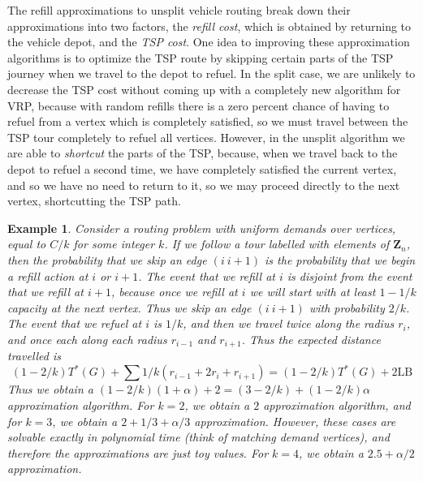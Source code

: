 \documentclass{article}
\theoremstyle{plain}
\newtheorem*{example}{Example}
\theoremstyle{plain}
\begin{document}
The refill approximations to unsplit vehicle routing break down their approximations into two factors, the {\it refill cost}, which is obtained by returning to the vehicle depot, and the {\it TSP cost}. One idea to improving these approximation algorithms is to optimize the TSP route by skipping certain parts of the TSP journey when we travel to the depot to refuel. In the split case, we are unlikely to decrease the TSP cost without coming up with a completely new algorithm for VRP, because with random refills there is a zero percent chance of having to refuel from a vertex which is completely satisfied, so we must travel between the TSP tour completely to refuel all vertices. However, in the unsplit algorithm we are able to {\it shortcut} the parts of the TSP, because, when we travel back to the depot to refuel a second time, we have completely satisfied the current vertex, and so we have no need to return to it, so we may proceed directly to the next vertex, shortcutting the TSP path.

\begin{example}
    Consider a routing problem with uniform demands over vertices, equal to $C/k$ for some integer $k$. If we follow a tour labelled with elements of $\mathbf{Z}_n$, then the probability that we skip an edge $(i\ i+1)$ is the probability that we begin a refill action at $i$ or $i+1$. The event that we refill at $i$ is disjoint from the event that we refill at $i+1$, because once we refill at $i$ we will start with at least $1-1/k$ capacity at the next vertex. Thus we skip an edge $(i\ i+1)$ with probability $2/k$. The event that we refuel at $i$ is $1/k$, and then we travel twice along the radius $r_i$, and once each along each radius $r_{i-1}$ and $r_{i+1}$. Thus the expected distance travelled is
    \[ (1 - 2/k) T^*(G) + \sum 1/k (r_{i-1} + 2r_i + r_{i+1}) = (1 - 2/k) T^*(G) + 2 \text{LB} \]
    Thus we obtain a $(1 - 2/k)(1 + \alpha) + 2 = (3 - 2/k) + (1-2/k) \alpha$ approximation algorithm. For $k = 2$, we obtain a $2$ approximation algorithm, and for $k = 3$, we obtain a $2 + 1/3 + \alpha/3$ approximation. However, these cases are solvable exactly in polynomial time (think of matching demand vertices), and therefore the approximations are just toy values. For $k = 4$, we obtain a $2.5 + \alpha/2$ approximation.
\end{example}
\end{document}

